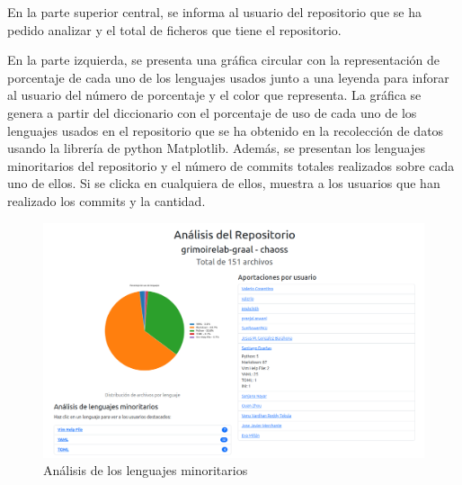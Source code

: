 \documentclass[a4paper, 12pt]{book}
\begin{document}
En la parte superior central, se informa al usuario del repositorio que se ha pedido analizar y el total de ficheros que tiene el repositorio.

En la parte izquierda, se presenta una gráfica circular con la representación de porcentaje de cada uno de los lenguajes usados junto a una leyenda para inforar al usuario del número de porcentaje y el color que representa. La gráfica se genera a partir del diccionario con el porcentaje de uso de cada uno de los lenguajes usados en el repositorio que se ha obtenido en la recolección de datos usando la librería de python Matplotlib. Además, se presentan los lenguajes minoritarios del repositorio y el número de commits totales realizados sobre cada uno de ellos. Si se clicka en cualquiera de ellos, muestra a los usuarios que han realizado los commits y la cantidad.

\begin{figure}[H]
  \centering
  \includegraphics[width=1\textwidth]{img/resultado2userrepo.png}
  \caption{Análisis de los lenguajes minoritarios}
  \label{figura:resultuserrepo2}
\end{figure}
\end{document}
